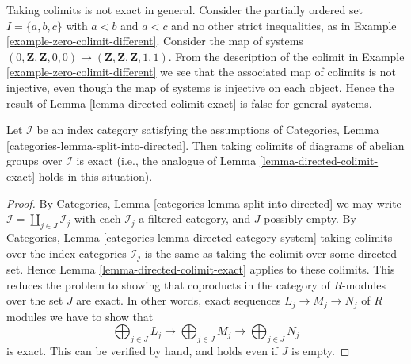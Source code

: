 \begin{example}
\label{example-colimit-not-exact}
Taking colimits is not exact in general.
Consider the partially ordered set $I = \{a, b, c\}$ with
$a < b$ and $a < c$ and no other strict inequalities,
as in Example \ref{example-zero-colimit-different}.
Consider the map of systems
$(0, \mathbf{Z}, \mathbf{Z}, 0, 0) \to
(\mathbf{Z}, \mathbf{Z}, \mathbf{Z}, 1, 1)$.
From the description of the colimit in
Example \ref{example-zero-colimit-different}
we see that the associated map of colimits is not injective,
even though the map of systems is injective on each object.
Hence the result of Lemma \ref{lemma-directed-colimit-exact}
is false for general systems.
\end{example}

\begin{lemma}
\label{lemma-almost-directed-colimit-exact}
Let $\mathcal{I}$ be an index category satisfying the assumptions of
Categories, Lemma \ref{categories-lemma-split-into-directed}.
Then taking colimits of diagrams of abelian groups over $\mathcal{I}$
is exact (i.e., the analogue of
Lemma \ref{lemma-directed-colimit-exact}
holds in this situation).
\end{lemma}

\begin{proof}
By
Categories, Lemma \ref{categories-lemma-split-into-directed}
we may write $\mathcal{I} = \coprod_{j \in J} \mathcal{I}_j$ with each
$\mathcal{I}_j$ a filtered category, and $J$ possibly empty. By
Categories, Lemma \ref{categories-lemma-directed-category-system}
taking colimits over the index categories $\mathcal{I}_j$ is
the same as taking the colimit over some directed set. Hence
Lemma \ref{lemma-directed-colimit-exact}
applies to these colimits. This reduces the problem to showing that
coproducts in the category of $R$-modules over the set $J$ are exact.
In other words, exact sequences
$L_j \to M_j \to N_j$ of $R$ modules we have to show that
$$
\bigoplus\nolimits_{j \in J} L_j
\longrightarrow
\bigoplus\nolimits_{j \in J} M_j
\longrightarrow
\bigoplus\nolimits_{j \in J} N_j
$$
is exact. This can be verified by hand, and holds even if $J$ is empty.
\end{proof}







